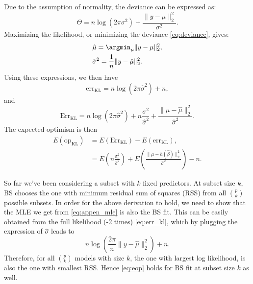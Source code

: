 Due to the assumption of normality, the deviance can be expressed as:
\begin{equation}
\Theta = n\log(2\pi \sigma^2) + \frac{\lVert y- \mu \rVert_2^2}{\sigma^2}.
\label{eq:deviance}
\end{equation}
Maximizing the likelihood, or minimizing the deviance \eqref{eq:deviance}, gives:
\begin{equation}
\begin{aligned}
& \hat{\mu} = \argmin_\mu  \lVert y-\mu \rVert_2^2,\\
&\hat{\sigma}^2 = \frac{1}{n} \lVert y-\hat{\mu}\rVert_2^2.
\label{eq:appen_mle}
\end{aligned}
\end{equation}
Using these expressions, we then have
\begin{equation}
\text{err}_\text{KL} = n \log(2\pi \hat{\sigma}^2) +n,
\label{eq:err_kl}
\end{equation}
and
\begin{equation*}
\text{Err}_\text{KL} = n\log(2\pi \hat{\sigma}^2) + n\frac{\sigma^2}{\hat{\sigma}^2} +\frac{\lVert \mu- \hat{\mu} \rVert_2^2}{\hat{\sigma}^2}.
\end{equation*}
The expected optimism is then
\begin{equation}
\begin{aligned}
E(\text{op}_\text{KL})  &= E(\text{Err}_\text{KL}) - E(\text{err}_\text{KL}),\\
&= E(n\frac{\sigma_0^2}{\hat{\sigma}^2}) + E(\frac{\lVert \mu-h(\hat{\beta}) \rVert_2^2}{\hat{\sigma}^2}) -n.
\end{aligned}
\label{eq:eop}
\end{equation}

So far we've been considering a subset with $k$ fixed predictors. At subset size $k$, BS chooses the one with minimum residual sum of squares (RSS) from all $\binom{p}{k}$ possible subsets. In order for the above derivation to hold, we need to show that the MLE we get from \eqref{eq:appen_mle} is also the BS fit. This can be easily obtained from the full likelihood (-2 times) \eqref{eq:err_kl}, which by plugging the expression of $\hat{\sigma}$ leads to
\begin{equation*}
n\log(\frac{2\pi}{n}\lVert y-\hat{\mu}\rVert_2^2) + n.
\end{equation*}
Therefore, for all $\binom{p}{k}$ models with size $k$, the one with largest log likelihood, is also the one with smallest RSS. Hence \eqref{eq:eop} holds for BS fit at subset size $k$ as well.

